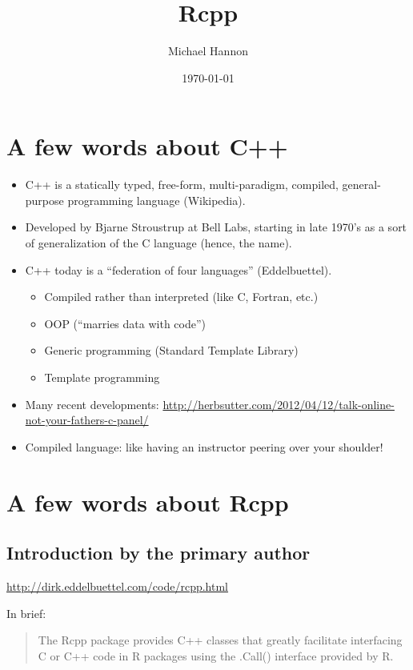 \documentclass[11pt]{article}
\title{Rcpp}
\author{Michael Hannon}
\date{\today}
\begin{document}
\maketitle

\setcounter{tocdepth}{3}
\tableofcontents
\vspace*{1cm}
\section{A few words about C++}
\label{sec-1}


\begin{itemize}
\item C++ is a statically typed, free-form, multi-paradigm, compiled,
  general-purpose programming language (Wikipedia).
\item Developed by Bjarne Stroustrup at Bell Labs, starting in late 1970's
  as a sort of generalization of the C language (hence, the name).
\item C++ today is a ``federation of four languages'' (Eddelbuettel).
\begin{itemize}
\item Compiled rather than interpreted (like C, Fortran, etc.)
\item OOP (``marries data with code'')
\item Generic programming (Standard Template Library)
\item Template programming
\end{itemize}
\item Many recent developments:
  \href{http://herbsutter.com/2012/04/12/talk-online-not-your-fathers-c-panel/}{http://herbsutter.com/2012/04/12/talk-online-not-your-fathers-c-panel/}
\item Compiled language: like having an instructor peering over your
  shoulder!
\end{itemize}
\section{A few words about Rcpp}
\label{sec-2}
\subsection{Introduction by the primary author}
\label{sec-2-1}


    \href{http://dirk.eddelbuettel.com/code/rcpp.html}{http://dirk.eddelbuettel.com/code/rcpp.html}

In brief:

\begin{quote}

The Rcpp package provides C++ classes that greatly facilitate
interfacing C or C++ code in R packages using the .Call() interface
provided by R. 

\end{quote}
\end{document}
